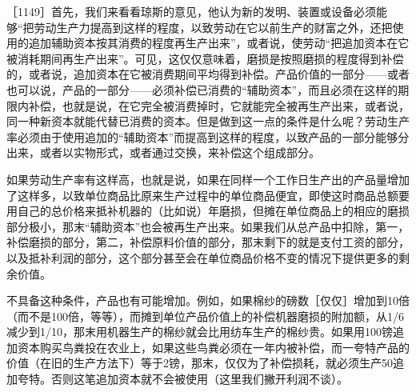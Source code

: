 ［1149］首先，我们来看看琼斯的意见，他认为新的发明、装置或设备必须能够“把劳动生产力提高到这样的程度，以致劳动在它以前生产的财富之外，还把使用的追加辅助资本按其消费的程度再生产出来”，或者说，使劳动“把追加资本在它被消耗期间再生产出来”。可见，这仅仅意味着，磨损是按照磨损的程度得到补偿的，或者说，追加资本在它被消费期间平均得到补偿。产品价值的一部分——或者也可以说，产品的一部分——必须补偿已消费的“辅助资本”，而且必须在这样的期限内补偿，也就是说，在它完全被消费掉时，它就能完全被再生产出来，或者说，同一种新资本就能代替已消费的资本。但是做到这一点的条件是什么呢？劳动生产率必须由于使用追加的“辅助资本”而提高到这样的程度，以致产品的一部分能够分出来，或者以实物形式，或者通过交换，来补偿这个组成部分。

如果劳动生产率有这样高，也就是说，如果在同样一个工作日生产出的产品量增加了这样多，以致单位商品比原来生产过程中的单位商品便宜，即使这时商品总额要用自己的总价格来抵补机器的（比如说）年磨损，但摊在单位商品上的相应的磨损部分极小，那末“辅助资本”也会被再生产出来。如果我们从总产品中扣除，第一，补偿磨损的部分，第二，补偿原料价值的部分，那末剩下的就是支付工资的部分，以及抵补利润的部分，这个部分甚至会在单位商品价格不变的情况下提供更多的剩余价值。

不具备这种条件，产品也有可能增加。例如，如果棉纱的磅数［仅仅］增加到10倍（而不是100倍，等等），而摊到单位产品价值上的补偿机器磨损的附加额，从1/6减少到1/10，那末用机器生产的棉纱就会比用纺车生产的棉纱贵。如果用100镑追加资本购买鸟粪投在农业上，如果这些鸟粪必须在一年内被补偿，而一夸特产品的价值（在旧的生产方法下）等于2镑，那末，仅仅为了补偿损耗，就必须生产50追加夸特。否则这笔追加资本就不会被使用（这里我们撇开利润不谈）。

